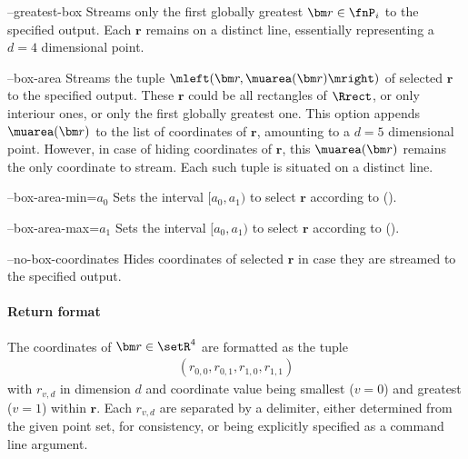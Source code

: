 \begin{procarg}{--greatest-box}
  Streams only the first globally greatest $\bm r \in \fnP_i$ to the specified output. Each $\bm r$ remains on a distinct line, essentially representing a $d=4$ dimensional point.
\end{procarg}

\begin{procarg}{--box-area}
  Streams the tuple $\mleft(\bm r, \muarea(\bm r)\mright)$ of selected $\bm r$ to the specified output. These $\bm r$ could be all rectangles of $\Rrect$, or only interiour ones, or only the first globally greatest one. This option appends $\muarea(\bm r)$ to the list of coordinates of $\bm r$, amounting to a $d=5$ dimensional point. However, in case of hiding coordinates of $\bm r$, this $\muarea(\bm r)$ remains the only coordinate to stream. Each such tuple is situated on a distinct line.
\end{procarg}

\begin{procarg}{--box-area-min=$a_0$}
  Sets the interval $[a_0, a_1)$ to select $\bm r$ according to ().
\end{procarg}

\begin{procarg}{--box-area-max=$a_1$}
  Sets the interval $[a_0, a_1)$ to select $\bm r$ according to ().
\end{procarg}

\begin{procarg}{--no-box-coordinates}
  Hides coordinates of selected $\bm r$ in case they are streamed to the specified output.
\end{procarg}

\procargsilent


\paragraph{Return format}

The coordinates of $\bm r \in \setR^4$ are formatted as the tuple
\begin{align*}
  (r_{0,0}, r_{0,1}, r_{1,0}, r_{1,1})
\end{align*}
with $r_{v,d}$ in dimension $d$ and coordinate value being smallest ($v=0$) and greatest ($v=1$) within $\bm r$. Each $r_{v,d}$ are separated by a delimiter, either determined from the given point set, for consistency, or being explicitly specified as a command line argument.

